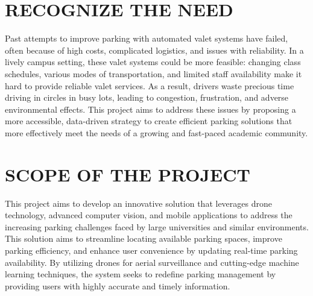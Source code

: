 \documentclass[conference]{IEEEtran}
\begin{document}
\section{RECOGNIZE THE NEED}
Past attempts to improve parking with automated valet systems have failed, 
often because of high costs, 
complicated logistics, 
and issues with reliability. 
In a lively campus setting, 
these valet systems could be more feasible: 
changing class schedules, 
various modes of transportation, 
and limited staff availability make it hard to provide reliable valet services. 
As a result, 
drivers waste precious time driving in circles in busy lots, 
leading to congestion, 
frustration, 
and adverse environmental effects. 
This project aims to address these issues by proposing a more accessible, 
data-driven strategy to create efficient parking solutions that more effectively meet the needs of a growing and fast-paced academic community.

\section{SCOPE OF THE PROJECT}

This project aims to develop an innovative solution that leverages drone technology, 
advanced computer vision, 
and mobile applications to address the increasing parking challenges faced by large universities and similar environments. 
This solution aims to streamline locating available parking spaces, 
improve parking efficiency, 
and enhance user convenience by updating real-time parking availability. 
By utilizing drones for aerial surveillance and cutting-edge machine learning techniques, 
the system seeks to redefine parking management by providing users with highly accurate and timely information.
\end{document}
